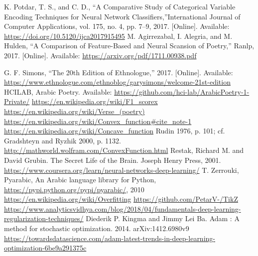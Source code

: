\begin{thebibliography}{999}
K. Potdar, T. S., and C. D., “A Comparative Study of Categorical Variable Encoding Techniques for Neural Network Classifiers,”International Journal of Computer Applications, vol. 175, no. 4, pp. 7–9, 2017. [Online]. Available: \url{https://doi.org/10.5120/ijca2017915495}
 M. Agirrezabal, I. Alegria, and M. Hulden, “A Comparison of Feature-Based and Neural Scansion of Poetry,” Ranlp, 2017. [Online]. Available: \url{https://arxiv.org/pdf/1711.00938.pdf}

 G. F. Simons, “The 20th Edition of Ethnologue,” 2017. [Online]. Available: \url{https://www.ethnologue.com/ethnoblog/garysimons/welcome-21st-edition}
 HCILAB, Arabic Poetry. Available: \url{https://github.com/hci-lab/ArabicPoetry-1-Private/}
 \url{https://en.wikipedia.org/wiki/F1\_scorex}
 \url{https://en.wikipedia.org/wiki/Verse\_(poetry)}
 \url{https://en.wikipedia.org/wiki/Convex\_function\#cite\_note-1}
 \url{https://en.wikipedia.org/wiki/Concave\_function}
 Rudin 1976, p. 101; cf. Gradshteyn and Ryzhik 2000, p. 1132.
 \url{http://mathworld.wolfram.com/ConvexFunction.html}
 Restak, Richard M. and David Grubin. The Secret Life of the Brain. Joseph Henry Press, 2001.
 \url{https://www.coursera.org/learn/neural-networks-deep-learning/}
 T. Zerrouki‏, Pyarabic, An Arabic language library for Python, \url{https://pypi.python.org/pypi/pyarabic/}, 2010
 \url{https://en.wikipedia.org/wiki/Overfitting}
  \url{https://github.com/PetarV-/TikZ}
 \url{https://www.analyticsvidhya.com/blog/2018/04/fundamentals-deep-learning-regularization-techniques/}
 Diederik P. Kingma and Jimmy Lei Ba. Adam : A method for stochastic optimization. 2014. arXiv:1412.6980v9
 \url{https://towardsdatascience.com/adam-latest-trends-in-deep-learning-optimization-6be9a291375c}  

\end{thebibliography}


%
%
%
%
\newpage

